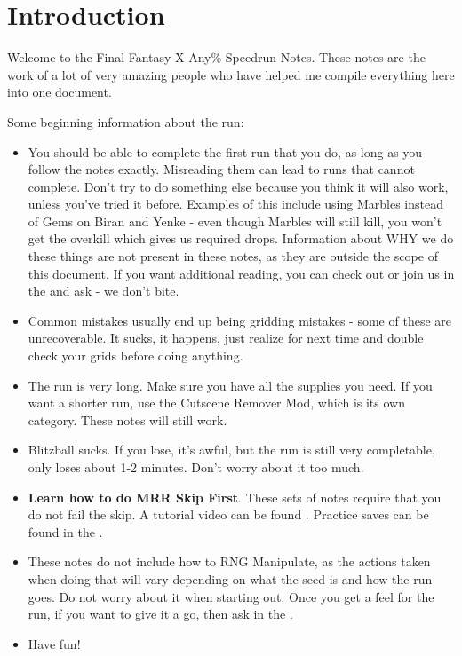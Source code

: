 \chapter{Introduction}

Welcome to the Final Fantasy X Any\% Speedrun Notes. These notes are the work of a lot of very amazing people who have helped me compile everything here into one document.

Some beginning information about the run:

\begin{itemize}
    \item You should be able to complete the first run that you do, as long as you follow the notes exactly. Misreading them can lead to runs that cannot complete. Don't try to do something else because you think it will also work, unless you've tried it before. Examples of this include using Marbles instead of Gems on Biran and Yenke - even though Marbles will still kill, you won't get the overkill which gives us required drops. Information about WHY we do these things are not present in these notes, as they are outside the scope of this document. If you want additional reading, you can check out  or join us in the  and ask - we don't bite.
    \item Common mistakes usually end up being gridding mistakes - some of these are unrecoverable. It sucks, it happens, just realize for next time and double check your grids before doing anything.
    \item The run is very long. Make sure you have all the supplies you need. If you want a shorter run, use the Cutscene Remover Mod, which is its own category. These notes will still work.
    \item Blitzball sucks. If you lose, it's awful, but the run is still very completable, only loses about 1-2 minutes. Don't worry about it too much.
    \item \textbf{Learn how to do MRR Skip First}. These sets of notes require that you do not fail the skip. A tutorial video can be found . Practice saves can be found in the .
    \item These notes do not include how to RNG Manipulate, as the actions taken when doing that will vary depending on what the seed is and how the run goes. Do not worry about it when starting out. Once you get a feel for the run, if you want to give it a go, then ask in the .
    \item Have fun!
\end{itemize}

